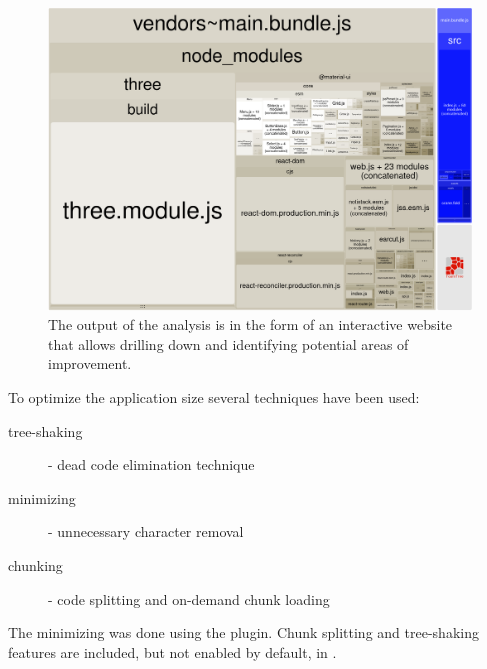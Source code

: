 \begin{figure}[H]
	\caption{The output of the analysis is in the form of an interactive website that allows drilling down and identifying potential areas of improvement.}
  \centering
    \includegraphics[width=\textwidth]{assets/3-bundle.png}
\end{figure}

To optimize the application size several techniques have been used:

\begin{description}
	\item[tree-shaking] - dead code elimination technique
	\item[minimizing] - unnecessary character removal
	\item[chunking] - code splitting and on-demand chunk loading
\end{description}

The minimizing was done using the  plugin. Chunk splitting and tree-shaking features are included, but not enabled by default, in .

